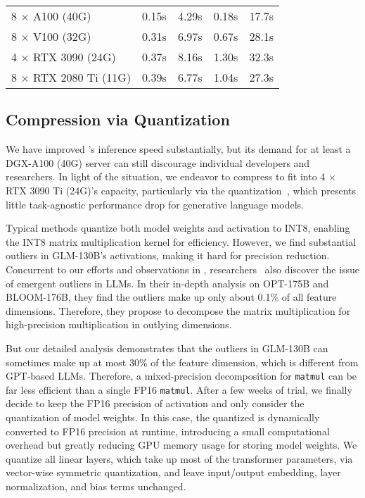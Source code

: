 {\begin{table*}[t]
\begin{subtable}
\begin{threeparttable}
\begin{tabular}{@{}lcccc@{}}
    8 $\times$ A100 (40G)        & 0.15s           & 4.29s           & 0.18s           & 17.7s           \\
    8 $\times$ V100 (32G)        & 0.31s           & 6.97s           & 0.67s           & 28.1s           \\
    4 $\times$ RTX 3090 (24G)    & 0.37s           & 8.16s           & 1.30s           & 32.3s           \\
    8 $\times$ RTX 2080 Ti (11G) & 0.39s           & 6.77s           & 1.04s           & 27.3s           \\ \bottomrule[1.2pt]
    \end{tabular}
    \end{threeparttable}
    \end{subtable}
    \vspace{-4mm}
\label{tab:quantization}
\end{table*}
\subsection{Compression via Quantization}
We have improved \glm's inference speed substantially, but its demand for at least a DGX-A100 (40G) server can still discourage individual developers and researchers.
In light of the situation, we endeavor to compress \glm to fit into 4 $\times$ RTX 3090 Ti (24G)'s capacity, particularly via the quantization~\citep{zafrir2019q8bert,shen2020q,tao2022compression}, which presents little task-agnostic performance drop for generative language models.

Typical methods quantize both model weights and activation to INT8, enabling the INT8 matrix multiplication kernel for efficiency. 
However, we find substantial outliers in GLM-130B's activations, making it hard for precision reduction. %
Concurrent to our efforts and observations in \glm, researchers~\citep{dettmers2022llm} also discover the issue of emergent outliers in LLMs. 
In their in-depth analysis on OPT-175B and BLOOM-176B, they find the outliers make up only about 0.1\% of all feature dimensions.
Therefore, they propose to decompose the matrix multiplication for high-precision multiplication in outlying dimensions.

But our detailed analysis demonstrates that the outliers in GLM-130B can sometimes make up at most 30\% of the feature dimension, which is different from GPT-based LLMs. %
Therefore, a mixed-precision decomposition for \texttt{matmul} can be far less efficient than a single FP16 \texttt{matmul}. 
After a few weeks of trial, we finally decide to keep the FP16 precision of activation and only consider the quantization of model weights. 
In this case, the quantized \glm is dynamically converted to FP16 precision at runtime, introducing a small computational overhead but greatly reducing GPU memory usage for storing model weights.
We quantize all linear layers, which take up most of the transformer parameters, via vector-wise symmetric quantization, and leave input/output embedding, layer normalization, and bias terms unchanged. 

}
